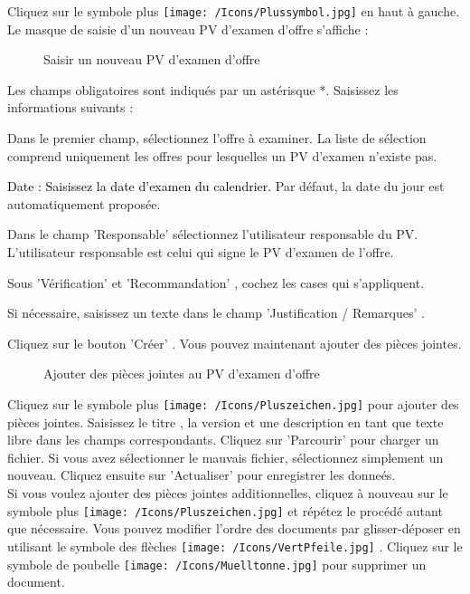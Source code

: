 Cliquez sur le symbole plus \texttt{[image: /Icons/Plussymbol.jpg]}  en haut à gauche. Le masque de saisie d'un nouveau PV d'examen d'offre s'affiche :

\begin{figure}[H]
\caption{Saisir un nouveau PV d'examen d'offre}
\end{figure}

Les champs obligatoires sont indiqués par un astérisque *. Saisissez les informations suivants :

\vspace{\baselineskip}

\begin{compactitem}
\item
Dans le premier champ, sélectionnez l'offre à examiner. La liste de sélection  comprend uniquement les offres pour lesquelles un PV d'examen n'existe pas.
\item
\textcolor{black}{Date } \textcolor{black}{: Saisissez la date d'examen du calendrier. }Par défaut, la date du jour est automatiquement proposée.
\item
Dans le champ 'Responsable'  sélectionnez l'utilisateur responsable du PV. L'utilisateur responsable est celui qui signe le PV d'examen de l'offre.
\item {\sffamily
Sous 'Vérification'  et 'Recommandation' , cochez les cases qui s'appliquent.}
\item
Si nécessaire, saisissez un texte dans le champ 'Justification / Remarques' .
\end{compactitem}

\vspace{\baselineskip}

Cliquez sur le bouton 'Créer' . Vous pouvez maintenant ajouter des pièces jointes.

\begin{figure}[H]
\caption{Ajouter des pièces jointes au PV d'examen d'offre}
\end{figure}

Cliquez sur le symbole plus \texttt{[image: /Icons/Pluszeichen.jpg]}  pour ajouter des pièces jointes. Saisissez le titre , la version  et une description  en tant que texte libre dans les champs correspondants. Cliquez sur 'Parcourir'  pour charger un fichier. Si vous avez sélectionner le mauvais fichier, sélectionnez simplement un nouveau. Cliquez ensuite sur 'Actualiser' pour enregistrer les donneés. \\
Si vous voulez ajouter des pièces jointes additionnelles, cliquez à nouveau sur le symbole plus \texttt{[image: /Icons/Pluszeichen.jpg]}  et répétez le procédé autant que nécessaire. Vous pouvez modifier l'ordre des documents par glisser-déposer en utilisant le symbole des flèches \texttt{[image: /Icons/VertPfeile.jpg]} . Cliquez sur le symbole de poubelle \texttt{[image: /Icons/Muelltonne.jpg]}  pour supprimer un document.

